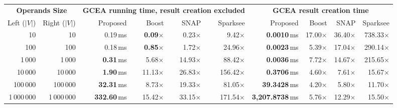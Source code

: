 \begin{table}[!t]
	\centering
	\begin{adjustbox}{max width=\textwidth}
		\begin{minipage}[b]{1.2\textwidth}
			\centering
			\begin{tabular}{@{}rr|r|rrr|r|rrr@{}}
				\toprule
				\multicolumn{2}{c}{\textbf{Operands Size}} & \multicolumn{4}{c}{\textbf{GCEA running time, result creation excluded}}& \multicolumn{4}{c}{\textbf{GCEA result creation time}}\\
				Left ($|V|$)  & Right ($|V|$)  &Proposed  & Boost  & SNAP  & Sparksee & Proposed  & Boost & SNAP  & Sparksee \\
				\midrule
				10 &  10 & 0.19\,ms & \textbf{0.09}$\times$ & 0.23$\times$ &  9.42$\times$ & \textbf{0.0010}\,ms & 17.00$\times$ & 36.40$\times$ & 738.33$\times$\\
				100 & 100 & 0.18\,ms & \textbf{0.85}$\times$ & 1.72$\times$ & 24.96$\times$ & \textbf{0.0023}\,ms &  5.39$\times$ & 17.04$\times$ & 290.14$\times$\\
				1\,000 & 1\,000 & \textbf{0.31}\,ms & 5.68$\times$ &14.93$\times$ & 88.42$\times$ & \textbf{0.0036}\,ms &  7.72$\times$ & 14.67$\times$ & 215.65$\times$\\
				10\,000 & 10\,000 & \textbf{1.90}\,ms &11.13$\times$ & 26.83$\times$ & 156.42$\times$ & \textbf{0.3706}\,ms &  4.60$\times$ &  7.61$\times$ &  15.67$\times$\\
				100\,000 & 100\,000 & \textbf{32.31}\,ms & 8.73$\times$ & 19.33$\times$ & 81.05$\times$ & \textbf{39.3428}\,ms &  4.20$\times$ &  5.80$\times$ &  11.70$\times$\\
				1\,000\,000 & 1\,000\,000 &  \textbf{332.60}\,ms & 15.42$\times$ & 33.15$\times$ & 171.54$\times$ & \textbf{3,207.8738}\,ms &  5.76$\times$ & 12.29$\times$ &  15.50$\times$\\
				\bottomrule
			\end{tabular}
			\label{fig:sumsizey}
		\end{minipage}
	\end{adjustbox}


\end{table}
